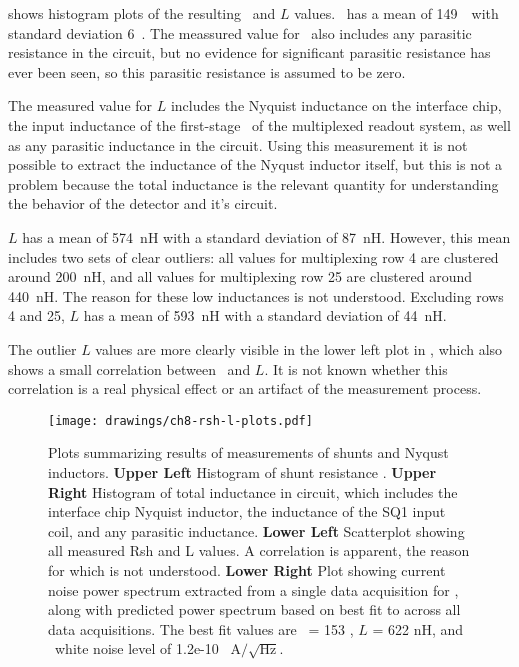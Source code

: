  shows histogram plots of the resulting \Rsh\ and $L$ values.
\Rsh\ has a mean of 149~\uOhm\ with standard deviation 6~\uOhm.
The meassured value for \Rsh\ also includes any parasitic resistance in the circuit, but no evidence for significant parasitic resistance has ever been seen, so this parasitic resistance is assumed to be zero.

The measured value for $L$ includes the Nyquist inductance on the interface chip, the input inductance of the first-stage \SQUID\ of the multiplexed readout system, as well as any parasitic inductance in the circuit.
Using this measurement it is not possible to extract the inductance of the Nyqust inductor itself, but this is not a problem because the total inductance is the relevant  quantity for understanding the behavior of the detector and it's circuit.

$L$ has a mean of 574~nH with a standard deviation of 87~nH.
However, this mean includes two sets of clear outliers: all values for multiplexing row 4 are clustered around 200~nH, and all values for multiplexing row 25 are clustered around 440~nH.
The reason for these low inductances is not understood.
Excluding rows 4 and 25,  $L$ has a mean of 593~nH with a standard deviation of 44~nH.

The outlier $L$ values are more clearly visible in the lower left plot in , which also shows a small correlation between \Rsh\ and $L$.
It is not known whether this correlation is a real physical effect or an artifact of the measurement process.

\begin{figure*}
\texttt{[image: drawings/ch8-rsh-l-plots.pdf]}
\caption{Plots summarizing results of measurements of shunts and Nyqust inductors.
\textbf{Upper Left} Histogram of shunt resistance \Rsh.
\textbf{Upper Right} Histogram of total inductance in circuit, which includes the interface chip Nyquist inductor, the inductance of the SQ1 input coil, and any parasitic inductance.
\textbf{Lower Left} Scatterplot showing all measured Rsh and L values. A correlation is apparent, the reason for which is not understood.
\textbf{Lower Right} Plot showing current noise power spectrum extracted from a single data acquisition for , along with predicted power spectrum based on best fit to  across all data acquisitions. The best fit values are \Rsh\ = 153 \uOhm, $L$ = 622 nH, and \SQUID\ white noise level of 1.2e-10~ A$/ \sqrt{\mbox{Hz}}$.}
\label{fig:rsh-l-plots}
\end{figure*}

